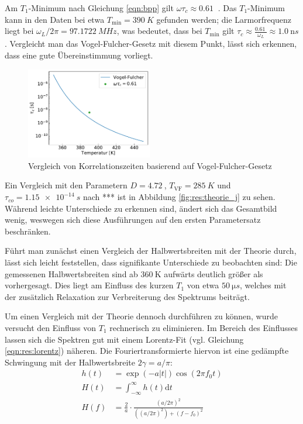 Am $T_1$-Minimum nach Gleichung \eqref{eqn:bpp} gilt $\omega \tau_c \approx \SI{0.61}{}$ \cite[S. 629]{omegatau061}. Das $T_1$-Minimum kann in den Daten bei etwa $T_\text{min} = \SI{390}{K}$ gefunden werden; die Larmorfrequenz liegt bei $\omega_L / 2\pi = \SI{97.1722}{MHz}$, was bedeutet, dass bei $T_\text{min}$ gilt $\tau_c \approx \frac{\SI{0.61}{}}{\omega_L} \approx \SI{1.0}{\nano s}$. Vergleicht man das Vogel-Fulcher-Gesetz mit diesem Punkt, lässt sich erkennen, dass eine gute Übereinstimmung vorliegt.
\begin{figure}
	\vspace{-20pt}
	\begin{center}
		\includegraphics[width=0.49\textwidth]{graphics/zwischenbericht/tau_c_arrhenius_vogel_fulcher.pdf}
	\end{center}
	\vspace{-20pt}
	\caption{Vergleich von Korrelationszeiten basierend auf Vogel-Fulcher-Gesetz \label{fig:korrelationszeiten}}
\end{figure}

Ein Vergleich mit den Parametern $D = \SI{4.72}{}$, $T_\text{VF} = \SI{285}{K}$ und $\tau_{co} = \SI{1.15e-14}{s}$ nach *** ist in Abbildung \ref{fig:res:theorie_j} zu sehen. Während leichte Unterschiede zu erkennen sind, ändert sich das Gesamtbild wenig, weswegen sich diese Ausführungen auf den ersten Parametersatz beschränken.




Führt man zunächst einen Vergleich der Halbwertsbreiten mit der Theorie durch, lässt sich leicht feststellen, dass signifikante Unterschiede zu beobachten sind: Die gemessenen Halbwertsbreiten sind ab $\SI{360}{\kelvin}$ aufwärts deutlich größer als vorhergesagt. Dies liegt am Einfluss des kurzen $T_1$ von etwa $\SI{50}{\micro s}$, welches mit der zusätzlich Relaxation zur Verbreiterung des Spektrums beiträgt.

Um einen Vergleich mit der Theorie dennoch durchführen zu können, wurde versucht den Einfluss von $T_1$ rechnerisch zu eliminieren. Im Bereich des Einflusses lassen sich die Spektren gut mit einem Lorentz-Fit (vgl. Gleichung \eqref{eqn:res:lorentz}) näheren. Die Fouriertransformierte hiervon ist eine gedämpfte Schwingung mit der Halbwertsbreite $2 \gamma = a/\pi$:
\begin{align}
	h(t) & = \exp{(-a |t|)} \cos{(2 \pi f_0 t)}                              \\
	H(t) & = \int_{-\infty}^{\infty} h(t) \text{d} t                         \\
	H(f) & = \frac{2}{a} \cdot \frac{(a/2\pi)^2}{((a/2\pi)^2) + (f - f_0)^2}
\end{align}

